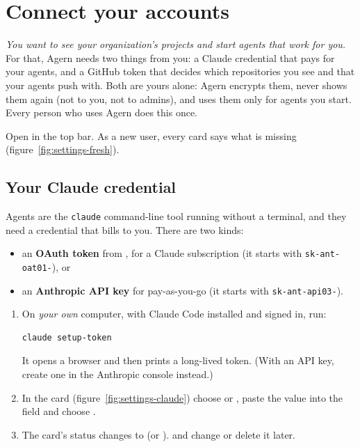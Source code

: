 \chapter{Connect your accounts}\label{ch:accounts}

\emph{You want to see your organization's projects and start agents that work for you.} For that,
Agern needs two things from you: a Claude credential that pays for your agents, and a GitHub token
that decides which repositories you see and that your agents push with. Both are yours alone:
Agern encrypts them, never shows them again (not to you, not to admins), and uses them only for
agents you start. Every person who uses Agern does this once.

Open  in the top bar. As a new user, every card says what is missing
(figure~\ref{fig:settings-fresh}).


\section{Your Claude credential}\label{sec:claude-credential}

Agents are the \texttt{claude} command-line tool running without a terminal, and they need a
credential that bills to you. There are two kinds:

\begin{itemize}
  \item an \textbf{OAuth token} from , for a Claude subscription (it starts
    with \texttt{sk-ant-oat01-}), or
  \item an \textbf{Anthropic API key} for pay-as-you-go (it starts with \texttt{sk-ant-api03-}).
\end{itemize}

\begin{enumerate}
  \item On \emph{your own} computer, with Claude Code installed and signed in, run:
\begin{lstlisting}
claude setup-token
\end{lstlisting}
    It opens a browser and then prints a long-lived token. (With an API key, create one in the
    Anthropic console instead.)
  \item In the  card (figure~\ref{fig:settings-claude}) choose  or , paste the value into the field and choose .
  \item The card's status changes to  (or ).
     and  change or delete it later.
\end{enumerate}

